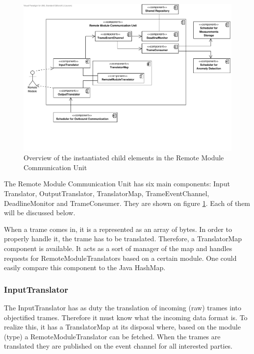 \begin{figure}[H]
	\begin{centering}
		\includegraphics[width=\textwidth]{figs/add-it2-elements.pdf}
		\caption{Overview of the instantiated child elements in the Remote Module
		Communication Unit}
		\label{fig:it2/elements}
	\end{centering}
\end{figure}

\npar The Remote Module Communication Unit has six main components: Input
Translator, OutputTranslator, TranslatorMap, TrameEventChannel, DeadlineMonitor
and TrameConsumer. They are shown on figure \ref{fig:it2/elements}. Each of them
will be discussed below.

\npar When a trame comes in, it is a represented as an array of bytes. In
order to properly handle it, the trame has to be translated. Therefore, a
TranslatorMap component is available. It acts as a sort of manager of the map
and handles requests for RemoteModuleTranslators based on a certain module. One
could easily compare this component to the Java HashMap. 

\subsubsection{InputTranslator}

\npar The InputTranslator has as duty the translation of incoming (raw) trames
into objectified trames. Therefore it must know what the incoming data format
is. To realize this, it has a TranslatorMap at its disposal where, based on
the module (type) a RemoteModuleTranslator can be fetched. When the trames are
translated they are published on the event channel for all interested parties.


